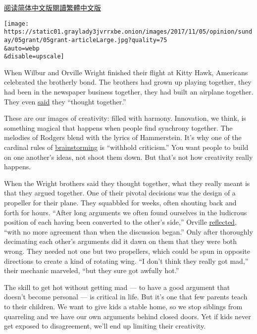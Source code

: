 \href{https://cn.nytimes3xbfgragh.onion/opinion/20171115/kids-would-you-please-start-fighting/}{阅读简体中文版}\href{https://cn.nytimes3xbfgragh.onion/opinion/20171115/kids-would-you-please-start-fighting/zh-hant/}{閱讀繁體中文版}

\texttt{[image: https://static01.graylady3jvrrxbe.onion/images/2017/11/05/opinion/sunday/05grant/05grant-articleLarge.jpg?quality=75\\\&auto=webp\\\&disable=upscale]}

When Wilbur and Orville Wright finished their flight at Kitty Hawk,
Americans celebrated the brotherly bond. The brothers had grown up
playing together, they had been in the newspaper business together, they
had built an airplane together. They even
\href{https://www.pbs.org/wnet/historyofus/web11/segment1_p.html}{said}
they ``thought together.''

These are our images of creativity: filled with harmony. Innovation, we
think, is something magical that happens when people find synchrony
together. The melodies of Rodgers blend with the lyrics of Hammerstein.
It's why one of the cardinal rules of
\href{https://hbr.org/2017/05/your-team-is-brainstorming-all-wrong}{brainstorming}
is ``withhold criticism.'' You want people to build on one another's
ideas, not shoot them down. But that's not how creativity really
happens.

When the Wright brothers said they thought together, what they really
meant is that they argued together. One of their pivotal decisions was
the design of a propeller for their plane. They squabbled for weeks,
often shouting back and forth for hours. ``After long arguments we often
found ourselves in the ludicrous position of each having been converted
to the other's side,'' Orville
\href{https://www.smithsonianbooks.com/store/aviation-military-history/published-writings-wilbur-and-orville-wright/}{reflected},
``with no more agreement than when the discussion began.'' Only after
thoroughly decimating each other's arguments did it dawn on them that
they were both wrong. They needed not one but two propellers, which
could be spun in opposite directions to create a kind of rotating wing.
``I don't think they really got mad,'' their mechanic marveled, ``but
they sure got awfully hot.''

The skill to get hot without getting mad --- to have a good argument
that doesn't become personal --- is critical in life. But it's one that
few parents teach to their children. We want to give kids a stable home,
so we stop siblings from quarreling and we have our own arguments behind
closed doors. Yet if kids never get exposed to disagreement, we'll end
up limiting their creativity.

